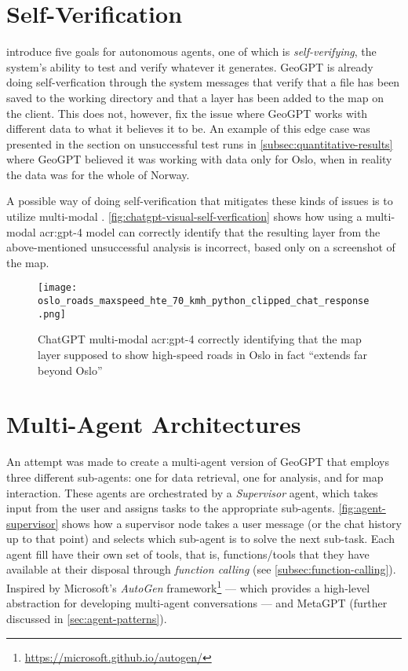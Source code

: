 \section{Self-Verification}
\label{sec:self-verification}

\cite{liAutonomousGISNextgeneration2023} introduce five goals for autonomous agents, one of which is \textit{self-verifying}, the system's ability to test and verify whatever it generates. GeoGPT is already doing self-verfication through the system messages that verify that a file has been saved to the working directory and that a layer has been added to the map on the client. This does not, however, fix the issue where GeoGPT works with different data to what it believes it to be. An example of this edge case was presented in the section on unsuccessful test runs in \autoref{subsec:quantitative-results} where GeoGPT believed it was working with data only for Oslo, when in reality the data was for the whole of Norway.

A possible way of doing self-verification that mitigates these kinds of issues is to utilize multi-modal . \autoref{fig:chatgpt-visual-self-verfication} shows how using a multi-modal \acrshort{acr:gpt}-4 model can correctly identify that the resulting layer from the above-mentioned unsuccessful analysis is incorrect, based only on a screenshot of the map.

\begin{figure}
    \centering
    \texttt{[image: oslo\_roads\_maxspeed\_hte\_70\_kmh\_python\_clipped\_chat\_response.png]}
    \caption{ChatGPT multi-modal \acrshort{acr:gpt}-4 correctly identifying that the map layer supposed to show high-speed roads in Oslo in fact \enquote{extends far beyond Oslo}}
    \label{fig:chatgpt-visual-self-verfication}
\end{figure}

\FloatBarrier

\section{Multi-Agent Architectures}
\label{sec:multi-agent-architectures}

An attempt was made to create a multi-agent version of GeoGPT that employs three different sub-agents: one for data retrieval, one for analysis, and for map interaction. These agents are orchestrated by a \textit{Supervisor} agent, which takes input from the user and assigns tasks to the appropriate sub-agents. \autoref{fig:agent-supervisor} shows how a supervisor node takes a user message (or the chat history up to that point) and selects which sub-agent is to solve the next sub-task. Each agent fill have their own set of tools, that is, functions/tools that they have available at their disposal through \textit{function calling} (see \autoref{subsec:function-calling}). Inspired by Microsoft's \textit{AutoGen} framework\footnote{\url{https://microsoft.github.io/autogen/}} --- which provides a high-level abstraction for developing multi-agent conversations --- and MetaGPT (further discussed in \autoref{sec:agent-patterns}).

